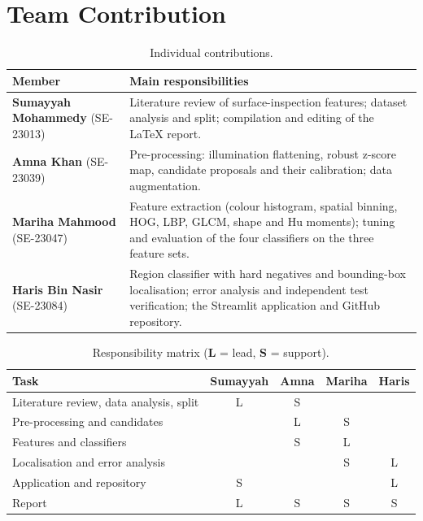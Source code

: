 \documentclass[11pt,a4paper]{report}
\begin{document}
\chapter{Team Contribution}
\begin{table}[H]
\centering
\caption{Individual contributions.}
\renewcommand{\arraystretch}{1.4}
\begin{tabularx}{\textwidth}{|p{3.2cm}|X|}
\hline
\textbf{Member} & \textbf{Main responsibilities}\\ \hline
\textbf{Sumayyah Mohammedy} (SE-23013) &
Literature review of surface-inspection features; dataset analysis and split; compilation
and editing of the LaTeX report.\\ \hline
\textbf{Amna Khan} (SE-23039) &
Pre-processing: illumination flattening, robust z-score map, candidate proposals and their
calibration; data augmentation.\\ \hline
\textbf{Mariha Mahmood} (SE-23047) &
Feature extraction (colour histogram, spatial binning, HOG, LBP, GLCM, shape and Hu
moments); tuning and evaluation of the four classifiers on the three feature sets.\\ \hline
\textbf{Haris Bin Nasir} (SE-23084) &
Region classifier with hard negatives and bounding-box localisation; error analysis and
independent test verification; the Streamlit application and GitHub repository.\\ \hline
\end{tabularx}
\end{table}
\begin{table}[H]
\centering
\caption{Responsibility matrix (\textbf{L} = lead, \textbf{S} = support).}
\begin{tabular}{lcccc}
\toprule
Task & Sumayyah & Amna & Mariha & Haris\\
\midrule
Literature review, data analysis, split & L & S & & \\
Pre-processing and candidates & & L & S & \\
Features and classifiers & & S & L & \\
Localisation and error analysis & & & S & L\\
Application and repository & S & & & L\\
Report & L & S & S & S\\
\bottomrule
\end{tabular}
\end{table}

\end{document}
